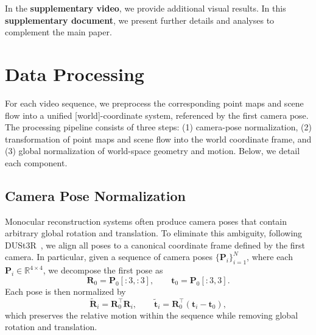 \clearpage
\setcounter{section}{0}
\maketitlesupplementary

\renewcommand{\thesection}{\Alph{section}}
\renewcommand{\thesubsection}{\thesection.\arabic{subsection}}
\renewcommand{\thesubsubsection}{\thesubsection.\arabic{subsubsection}}

In the \textbf{supplementary video}, we provide additional visual results.
In this \textbf{supplementary document}, we present further details and analyses to complement the main paper.


\section{Data Processing}
\label{sec:preprocess}

For each video sequence,
we preprocess the corresponding point maps and scene flow into a unified [world]-coordinate system,
referenced by the first camera pose.
The processing pipeline consists of three steps:
(1) camera-pose normalization,
(2) transformation of point maps and scene flow into the world coordinate frame, and
(3) global normalization of world-space geometry and motion. Below, we detail each component.

\subsection{Camera Pose Normalization}

Monocular reconstruction systems often produce camera poses that contain arbitrary global rotation and translation.
To eliminate this ambiguity,
following DUSt3R~\cite{wang2024dust3r},
we align all poses to a canonical coordinate frame defined by the first camera.
In particular,
given a sequence of camera poses 
$\{\bm{P}_i\}_{i=1}^N$,
where each $\bm{P}_i \in \mathbb{R}^{4 \times 4}$, 
we decompose the first pose as
\begin{equation}
\bm{R}_0 = \bm{P}_0[:3,:3], \qquad \bm{t}_0 = \bm{P}_0[:3,3].
\end{equation}
Each pose is then normalized by
\begin{equation}
\tilde{\bm{R}}_i = \bm{R}_0^\top \bm{R}_i, \qquad
\tilde{\bm{t}}_i = \bm{R}_0^\top (\bm{t}_i - \bm{t}_0),
\end{equation}
which preserves the relative motion within the sequence while removing global rotation and translation.

